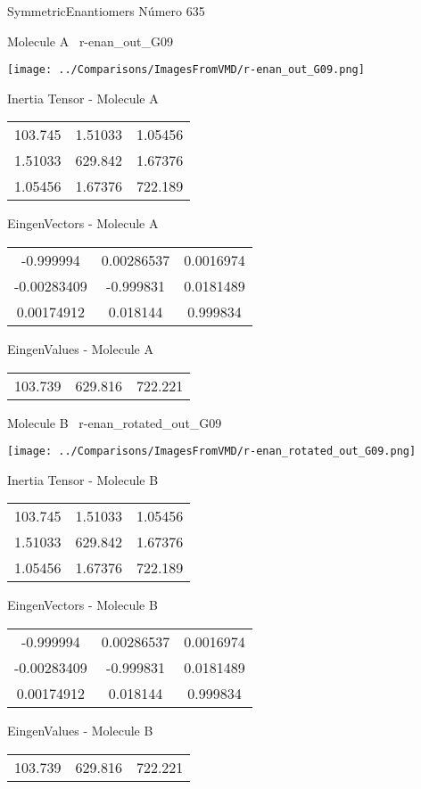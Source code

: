 \vtab[-3cm]
\begin{center}
{\large SymmetricEnantiomers \tab Número 635}
\end{center}
\begin{multicols}{2}
\begin{center}

Molecule A \
r-enan\_out\_G09

\texttt{[image: ../Comparisons/ImagesFromVMD/r-enan\_out\_G09.png]}

Inertia Tensor - Molecule A \\
\begin{tabular}{|c c c|}
103.745	 & 	1.51033	 & 	1.05456	 \\
1.51033	 & 	629.842	 & 	1.67376	 \\
1.05456	 & 	1.67376	 & 	722.189
\end{tabular}

\vtab
 EingenVectors - Molecule A     \\
\begin{tabular}{|c c c|}
-0.999994	 & 	0.00286537	 & 	0.0016974	 \\
-0.00283409	 & 	-0.999831	 & 	0.0181489	 \\
0.00174912	 & 	0.018144	 & 	0.999834
\end{tabular}

\vtab
 EingenValues - Molecule A     \\
\begin{tabular}{|c c c|}
103.739	 & 	629.816	 & 	722.221	 \\
\end{tabular}
\columnbreak

Molecule B \
r-enan\_rotated\_out\_G09

\texttt{[image: ../Comparisons/ImagesFromVMD/r-enan\_rotated\_out\_G09.png]}

Inertia Tensor - Molecule B \\
\begin{tabular}{|c c c|}
103.745	 & 	1.51033	 & 	1.05456	 \\
1.51033	 & 	629.842	 & 	1.67376	 \\
1.05456	 & 	1.67376	 & 	722.189
\end{tabular}

\vtab
 EingenVectors - Molecule B     \\
\begin{tabular}{|c c c|}
-0.999994	 & 	0.00286537	 & 	0.0016974	 \\
-0.00283409	 & 	-0.999831	 & 	0.0181489	 \\
0.00174912	 & 	0.018144	 & 	0.999834
\end{tabular}

\vtab
 EingenValues - Molecule B     \\
\begin{tabular}{|c c c|}
103.739	 & 	629.816	 & 	722.221	 \\
\end{tabular}

\end{center}
\end{multicols}

